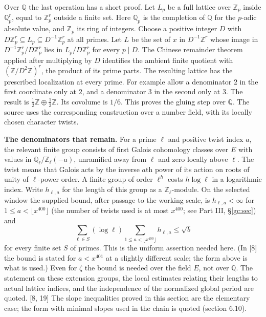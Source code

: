 \documentclass[11pt,letterpaper]{article}
\begin{document}
{Over $\mathbb Q$ the last operation has a short proof. Let $L_p$ be a full lattice over $\mathbb Z_p$ inside $\mathbb Q_p^r$, equal to $\mathbb Z_p^r$ outside a finite set. Here $\mathbb Q_p$ is the completion of $\mathbb Q$ for the $p$-adic absolute value, and $\mathbb Z_p$ its ring of integers. Choose a positive integer $D$ with $D\mathbb Z_p^r\subseteq L_p\subseteq D^{-1}\mathbb Z_p^r$ at all primes. Let $L$ be the set of $x$ in $D^{-1}\mathbb Z^r$ whose image in $D^{-1}\mathbb Z_p^r/D\mathbb Z_p^r$ lies in $L_p/D\mathbb Z_p^r$ for every $p\mid D$. The Chinese remainder theorem applied after multiplying by $D$ identifies the ambient finite quotient with $(\mathbb Z/D^2\mathbb Z)^r$, the product of its prime parts. The resulting lattice has the prescribed localization at every prime. For example allow a denominator $2$ in the first coordinate only at $2$, and a denominator $3$ in the second only at $3$. The result is $\tfrac12\mathbb Z\oplus\tfrac13\mathbb Z$. Its covolume is $1/6$. This proves the gluing step over $\mathbb Q$. The source uses the corresponding construction over a number field, with its locally chosen character twists.

\textbf{The denominators that remain.} For a prime $\ell$ and positive twist index $a$, the relevant finite group consists of first Galois cohomology classes over $E$ with values in $\mathbb Q_\ell/\mathbb Z_\ell(-a)$, unramified away from $\ell$ and zero locally above $\ell$. The twist means that Galois acts by the inverse $a$th power of its action on roots of unity of $\ell$-power order. A finite group of order $\ell^h$ costs $h\log\ell$ in a logarithmic index. Write $h_{\ell,a}$ for the length of this group as a $\mathbb Z_\ell$-module. On the selected window the supplied bound, after passage to the working scale, is $h_{\ell,a}<\infty$ for $1\le a<\lfloor x^{400}\rfloor$ (the number of twists used is at most $x^{400}$; see Part III, \S\ref{gc:sec}) and
\begin{equation}\label{II:shabound}
 \sum_{\ell\in S}(\log\ell)\sum_{1\le a<\lfloor x^{400}\rfloor}h_{\ell,a}\le\sqrt b
\end{equation}
for every finite set $S$ of primes. This is the uniform assertion needed here. (In [8] the bound is stated for $a<x^{401}$ at a slightly different scale; the form above is what is used.) Even for $\zeta$ the bound is needed over the field $E$, not over $\mathbb Q$. The statement on these extension groups, the local estimates relating their lengths to actual lattice indices, and the independence of the normalized global period are quoted. [8, 19] The slope inequalities proved in this section are the elementary case; the form with minimal slopes used in the chain is quoted (section 6.10).

}
\end{document}
